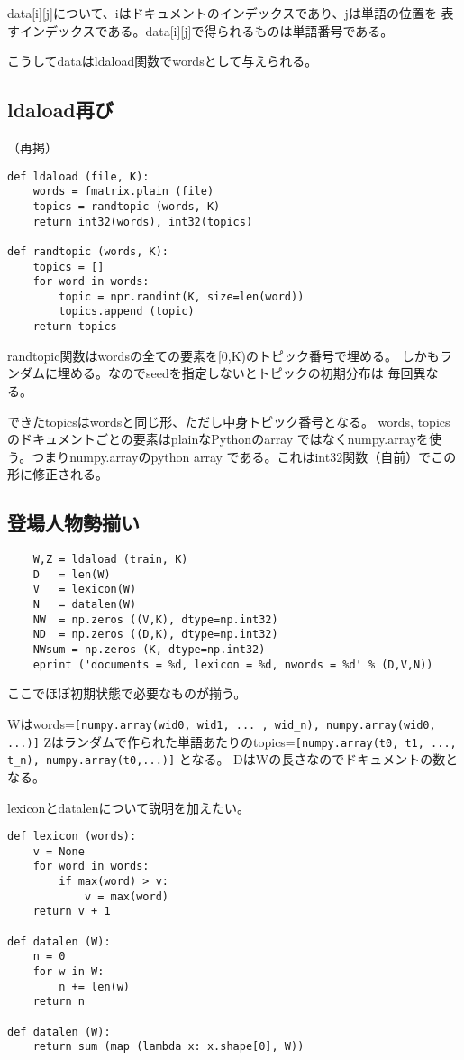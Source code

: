 \documentclass[uplatex]{jsarticle}
\begin{document}
data[i][j]について、iはドキュメントのインデックスであり、jは単語の位置を
表すインデックスである。data[i][j]で得られるものは単語番号である。

こうしてdataはldaload関数でwordsとして与えられる。

\subsection{ldaload再び}

（再掲）
\begin{lstlisting}
def ldaload (file, K):
    words = fmatrix.plain (file)
    topics = randtopic (words, K)
    return int32(words), int32(topics)

def randtopic (words, K):
    topics = []
    for word in words:
        topic = npr.randint(K, size=len(word))
        topics.append (topic)
    return topics

\end{lstlisting}

randtopic関数はwordsの全ての要素を[0,K)のトピック番号で埋める。
しかもランダムに埋める。なのでseedを指定しないとトピックの初期分布は
毎回異なる。

できたtopicsはwordsと同じ形、ただし中身トピック番号となる。
words, topicsのドキュメントごとの要素はplainなPythonのarray
ではなくnumpy.arrayを使う。つまりnumpy.arrayのpython array
である。これはint32関数（自前）でこの形に修正される。

\subsection{登場人物勢揃い}

\begin{lstlisting}
    W,Z = ldaload (train, K)
    D   = len(W)
    V   = lexicon(W)
    N   = datalen(W)
    NW  = np.zeros ((V,K), dtype=np.int32)
    ND  = np.zeros ((D,K), dtype=np.int32)
    NWsum = np.zeros (K, dtype=np.int32)
    eprint ('documents = %d, lexicon = %d, nwords = %d' % (D,V,N))
\end{lstlisting}

ここでほぼ初期状態で必要なものが揃う。

Wはwords=\verb+[numpy.array(wid0, wid1, ... , wid_n), numpy.array(wid0, ...)]+
Zはランダムで作られた単語あたりのtopics=\verb+[numpy.array(t0, t1, ..., t_n), numpy.array(t0,...)]+
となる。
DはWの長さなのでドキュメントの数となる。

lexiconとdatalenについて説明を加えたい。

\begin{lstlisting}
def lexicon (words):
    v = None
    for word in words:
        if max(word) > v:
            v = max(word)
    return v + 1

def datalen (W):
    n = 0
    for w in W:
        n += len(w)
    return n

def datalen (W):
    return sum (map (lambda x: x.shape[0], W))
\end{lstlisting}
\end{document}
